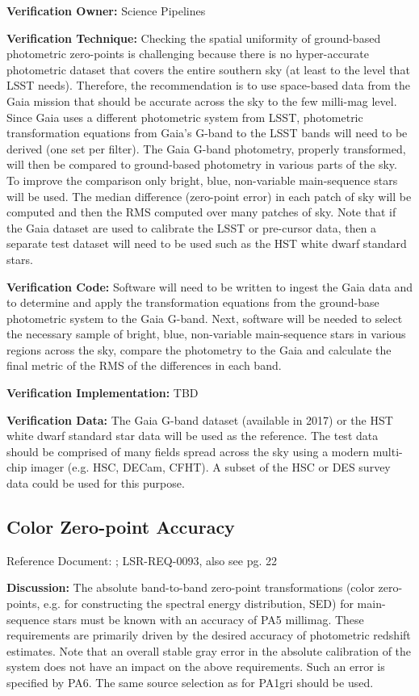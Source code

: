 \documentclass[DM,lsstdraft,toc]{lsstdoc}
\begin{document}
\textbf{Verification Owner:} Science Pipelines

\textbf{Verification Technique:} Checking the spatial uniformity of
ground-based photometric zero-points is challenging because there is no
hyper-accurate photometric dataset that covers the entire southern sky
(at least to the level that LSST needs). Therefore, the recommendation
is to use space-based data from the Gaia mission that should be accurate
across the sky to the few milli-mag level. Since Gaia uses a different
photometric system from LSST, photometric transformation equations from
Gaia's G-band to the LSST bands will need to be derived (one set per
filter). The Gaia G-band photometry, properly transformed, will then be
compared to ground-based photometry in various parts of the sky. To
improve the comparison only bright, blue, non-variable main-sequence
stars will be used. The median difference (zero-point error) in each
patch of sky will be computed and then the RMS computed over many
patches of sky. Note that if the Gaia dataset are used to calibrate the
LSST or pre-cursor data, then a separate test dataset will need to be
used such as the HST white dwarf standard stars.

\textbf{Verification Code:} Software will need to be written to ingest
the Gaia data and to determine and apply the transformation equations
from the ground-base photometric system to the Gaia G-band. Next,
software will be needed to select the necessary sample of bright, blue,
non-variable main-sequence stars in various regions across the sky,
compare the photometry to the Gaia and calculate the final metric of the
RMS of the differences in each band.

\textbf{Verification Implementation:} TBD

\textbf{Verification Data:} The Gaia G-band dataset (available in 2017)
or the HST white dwarf standard star data will be used as the reference.
The test data should be comprised of many fields spread across the sky
using a modern multi-chip imager (e.g. HSC, DECam, CFHT). A subset of
the HSC or DES survey data could be used for this purpose.

\subsection{Color Zero-point Accuracy}\label{color-zero-point-accuracy}

Reference Document: ; LSR-REQ-0093, also see \SRD pg. 22

\textbf{Discussion:} The absolute band-to-band zero-point
transformations (color zero-points, e.g. for constructing the spectral
energy distribution, SED) for main-sequence stars must be known with an
accuracy of PA5 millimag. These requirements are primarily driven by the
desired accuracy of photometric redshift estimates. Note that an overall
stable gray error in the absolute calibration of the system does not
have an impact on the above requirements. Such an error is specified by
PA6. The same source selection as for PA1gri should be used.
\end{document}
